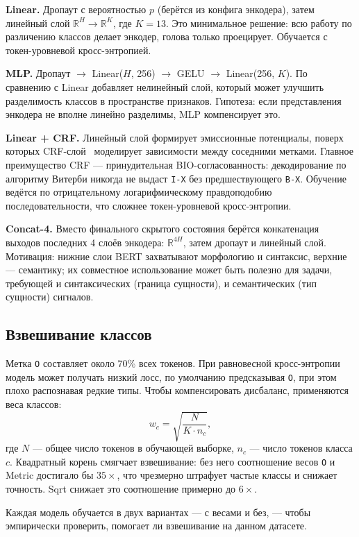 \textbf{Linear.} Дропаут с вероятностью $p$ (берётся из конфига энкодера), затем линейный слой $\mathbb{R}^{H} \to \mathbb{R}^{K}$, где $K = 13$. Это минимальное решение: всю работу по различению классов делает энкодер, голова только проецирует. Обучается с токен-уровневой кросс-энтропией.

\textbf{MLP.} Дропаут $\to$ Linear($H$, 256) $\to$ GELU $\to$ Linear(256, $K$). По сравнению с Linear добавляет нелинейный слой, который может улучшить разделимость классов в пространстве признаков. Гипотеза: если представления энкодера не вполне линейно разделимы, MLP компенсирует это.

\textbf{Linear + CRF.} Линейный слой формирует эмиссионные потенциалы, поверх которых CRF-слой~\cite{lafferty2001crf} моделирует зависимости между соседними метками. Главное преимущество CRF --- принудительная BIO-согласованность: декодирование по алгоритму Витерби никогда не выдаст \texttt{I-X} без предшествующего \texttt{B-X}. Обучение ведётся по отрицательному логарифмическому правдоподобию последовательности, что сложнее токен-уровневой кросс-энтропии.

\textbf{Concat-4.} Вместо финального скрытого состояния берётся конкатенация выходов последних 4 слоёв энкодера: $\mathbb{R}^{4H}$, затем дропаут и линейный слой. Мотивация: нижние слои BERT захватывают морфологию и синтаксис, верхние --- семантику; их совместное использование может быть полезно для задачи, требующей и синтаксических (граница сущности), и семантических (тип сущности) сигналов.

\subsection{Взвешивание классов}

Метка \texttt{O} составляет около 70\% всех токенов. При равновесной кросс-энтропии модель может получать низкий лосс, по умолчанию предсказывая \texttt{O}, при этом плохо распознавая редкие типы. Чтобы компенсировать дисбаланс, применяются веса классов:
\[
    w_c = \sqrt{\frac{N}{K \cdot n_c}},
\]
где $N$ --- общее число токенов в обучающей выборке, $n_c$ --- число токенов класса $c$. Квадратный корень смягчает взвешивание: без него соотношение весов \texttt{O} и Metric достигало бы $35\times$, что чрезмерно штрафует частые классы и снижает точность. Sqrt снижает это соотношение примерно до $6\times$.

Каждая модель обучается в двух вариантах --- с весами и без, --- чтобы эмпирически проверить, помогает ли взвешивание на данном датасете.


